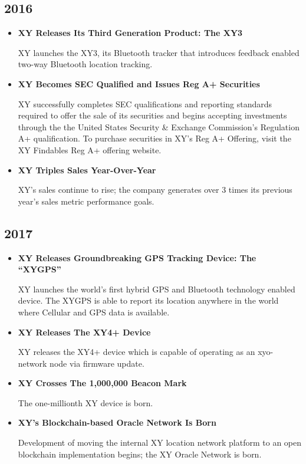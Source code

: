 \documentclass{article}
\begin{document}
\subsection{2016}
\begin{itemize}
\item \textbf{XY Releases Its Third Generation Product: The XY3}

XY launches the XY3, its Bluetooth tracker that introduces feedback enabled two-way Bluetooth location tracking.

\item \textbf{XY Becomes SEC Qualified and Issues Reg A+ Securities}

XY successfully completes SEC qualifications and reporting standards required to offer the sale of its securities and begins accepting investments through the the United States Security \& Exchange Commission's Regulation A+ qualification. To purchase securities in XY's Reg A+ Offering, visit the XY Findables Reg A+ offering website.

\item \textbf{XY Triples Sales Year-Over-Year}

XY's sales continue to rise; the company generates over 3 times its previous year's sales metric performance goals.
\end{itemize}

\subsection{2017}
\begin{itemize}
\item \textbf{XY Releases Groundbreaking GPS Tracking Device: The ``XYGPS''}

XY launches the world's first hybrid GPS and Bluetooth technology enabled device. The XYGPS is able to report its location anywhere in the world where Cellular and GPS data is available.

\item \textbf{XY Releases The XY4+ Device}

XY releases the XY4+ device which is capable of operating as an \Gls{xyo-network} node via firmware update.

\item \textbf{XY Crosses The 1,000,000 Beacon Mark}

The one-millionth XY device is born.

\item \textbf{XY's Blockchain-based Oracle Network Is Born}

Development of moving the internal XY location network platform to an open blockchain implementation begins; the XY Oracle Network is born.
\end{itemize}
\end{document}
